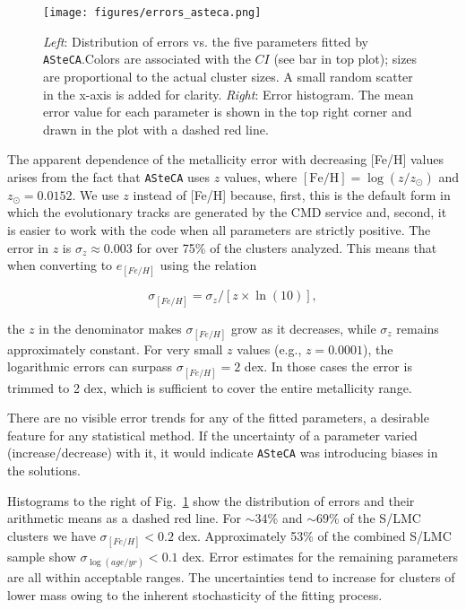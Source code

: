 \documentclass[draft]{aa}
\renewcommand{\includegraphics}[2][]{}
\begin{document}
\begin{figure}[!ht]
\centering
\texttt{[image: figures/errors\_asteca.png]}
\caption{\emph{Left}: Distribution of errors vs. the five parameters fitted
by \texttt{ASteCA}.\@ Colors are associated with the $CI$ (see bar in top plot);
sizes are proportional to the actual cluster sizes. A small random scatter in
the x-axis is added for clarity.
\emph{Right}: Error histogram. The mean error value for each parameter is shown
in the top right corner and drawn in the plot with a dashed red line.}
\label{fig:errors}
\end{figure}

The apparent dependence of the metallicity error with decreasing [Fe/H] values
arises from the fact that \texttt{ASteCA} uses $z$ values, where
$\mathrm{[Fe/H]}{=}\log(z/z_{\odot})$ and  $z_{\odot}{=}0.0152$. We use $z$
instead of [Fe/H] because, first, this is the default form in which the evolutionary
tracks are generated by the CMD service and, second, it is easier to work with the
code when all parameters are strictly positive.
The error in $z$ is $\sigma_z{\approx}0.003$ for over 75\% of the clusters
analyzed. This means that when converting to $e_{[Fe/H]}$ using the relation

\begin{equation}
\sigma_{[Fe/H]} = \sigma_z/[z\times\ln(10)],
\end{equation}

\noindent the $z$ in the denominator makes $\sigma_{[Fe/H]}$ grow as it
decreases, while $\sigma_z$ remains approximately constant.
For very small $z$ values (e.g., $z{=}0.0001$), the logarithmic errors can
surpass $\sigma_{[Fe/H]}{=}2$ dex. In those cases the error is trimmed to 2 dex,
which is sufficient to cover the entire metallicity range.

There are no visible error trends for any of the fitted parameters, a desirable
feature for any statistical method. If the uncertainty of a parameter varied 
(increase/decrease) with it, it would indicate \texttt{ASteCA} was
introducing biases in the solutions.

Histograms to the right of Fig.~\ref{fig:errors} show the distribution
of errors and their arithmetic means as a dashed red line.
For $\sim$34\% and ${\sim}69\%$ of the S/LMC clusters we have
$\sigma_{[Fe/H]}{<}0.2$ dex.
Approximately 53\% of the combined S/LMC sample show
$\sigma_{\log(age/yr)}{<}0.1$ dex. Error estimates for the remaining parameters
are all within acceptable ranges. The uncertainties tend to increase for
clusters of lower mass owing to the inherent stochasticity of the fitting
process.\\
\end{document}
